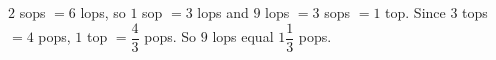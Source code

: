 $2$ sops $=6$ lops, so $1$ sop $=3$ lops and $9$ lops $=3$ sops $=1$ top. Since $3$ tops $=4$ pops, $1$ top $=\dfrac43$ pops. So $9$ lops equal $\boxed{1\dfrac13}$ pops.
